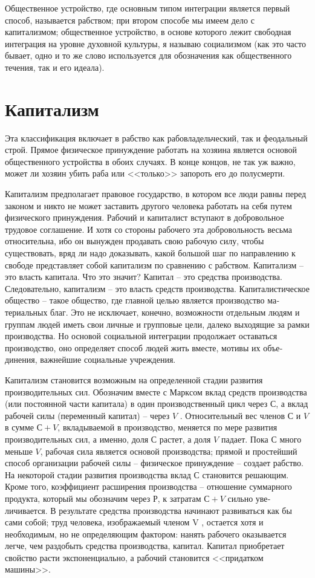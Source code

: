 \documentclass{book}
\begin{document}
Общественное устройство, где основным типом интеграции является первый способ, называется рабством;  при втором способе мы имеем дело с капитализмом;  общественное устройство, в основе которого лежит свободная интеграция на уровне духовной культуры, я называю социализмом  (как это часто бывает, одно и то же слово используется для обозначения как общественного течения, так и его идеала).



\section{Капитализм}

Эта классификация включает в рабство как рабовладельческий, так и феодальный строй. Прямое физическое принуждение работать на хозяина является основой общественного устройства в обоих случаях. В конце концов, не так уж важно, может ли хозяин убить раба или <<только>> запороть его до полусмерти.

Капитализм предполагает правовое государство, в котором все люди равны перед законом и никто не может заставить другого человека работать на себя путем физического принуждения. Рабочий и капиталист вступают в добровольное трудовое соглашение. И хотя со стороны рабочего эта добровольность весьма относительна, ибо он вынужден продавать свою рабо­чую силу, чтобы существовать, вряд ли надо доказывать, какой большой шаг по направлению к свободе представляет собой капитализм по сравнению с рабством.
Капитализм -- это власть капитала. Что это значит? Капитал -- это средства производства. Следовательно, капитализм -- это власть средств производства. Капиталистическое общество -- такое общество, где главной целью является производство ма­териальных благ. Это не исключает, конечно, возможности от­дельным людям и группам людей иметь свои личные и группо­вые цели, далеко выходящие за рамки производства. Но осно­вой социальной интеграции  продолжает оставаться производст­во, оно определяет способ людей жить вместе, мотивы их объе­динения, важнейшие социальные учреждения.

Капитализм становится возможным на определенной ста­дии развития производительных сил. Обозначим вместе с Марк­сом вклад средств производства (или постоянной части капи­тала) в один производственный цикл через $С$, а вклад рабочей силы (переменный капитал) -- через $V$ . Относительный вес членов $С$ и $V$ в сумме $С + V$, вкладываемой в производство, меняется по мере развития производительных сил, а именно, доля $С$ растет, а доля $V$ падает. Пока $С$ много меньше $V$, рабо­чая сила является основой производства; прямой и простейший способ организации рабочей силы -- физическое принуждение -- создает рабство. На некоторой стадии развития производства вклад $С$ становится решающим. Кроме того, коэффициент расширения производства -- отношение суммарного продукта, который мы обозначим через $Р$, к затратам $С + V$ сильно уве­личивается. В результате средства производства начинают раз­виваться как бы сами собой; труд человека, изображаемый членом V , остается хотя и необходимым, но не определяющим фактором: 
нанять рабочего оказывается легче, чем раздобыть средства производства, капитал. Капитал приобретает свойст­во расти экспоненциально, а рабочий становится <<придатком машины>>.
\end{document}
